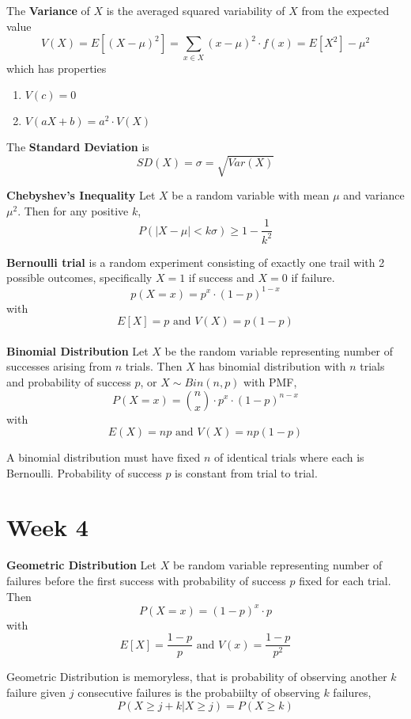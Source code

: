 \documentclass[11pt]{article}
\begin{document}
\begin{defn}
  The \textbf{Variance} of $X$ is the averaged squared variability of $X$ from the expected value
  \[
    V(X) = E[(X-\mu)^2] = \sum_{x\in X} (x-\mu)^2 \cdot f(x) = E[X^2] - \mu^2
  \]
  which has properties
  \begin{enumerate}
    \item $V(c) = 0$
    \item $V(aX + b) = a^2 \cdot V(X)$
  \end{enumerate}
  The \textbf{Standard Deviation} is
  \[
    SD(X) = \sigma = \sqrt{Var(X)}
  \]
\end{defn}


\begin{theorem}
  \textbf{Chebyshev's Inequality} Let $X$ be a random variable with mean $\mu$ and variance $\mu^2$. Then for any positive $k$,
  \[
    P(|X-\mu| < k\sigma) \geq 1 - \frac{1}{k^2}
  \]
\end{theorem}


\textbf{Bernoulli trial} is a random experiment consisting of exactly one trail with 2 possible outcomes, specifically $X=1$ if success and $X=0$ if failure.
\[
  p(X=x) = p^x \cdot (1-p)^{1-x}
\]
with
\[
  E[X] = p \text{ and } V(X) = p(1-p)
\]
\\

\textbf{Binomial Distribution} Let $X$ be the random variable representing number of successes arising from $n$ trials. Then $X$ has binomial distribution with $n$ trials and probability of success $p$, or $X\sim Bin(n,p)$ with PMF,
\[
  P(X=x) = \binom{n}{x} \cdot p^x \cdot (1-p)^{n-x}
\]
with
\[
  E(X) = np \text{ and } V(X) = np(1-p)
\]
\begin{rem}
  A binomial distribution must have fixed $n$ of identical trials where each is Bernoulli. Probability of success $p$ is constant from trial to trial.
\end{rem}



\section*{Week 4}

\textbf{Geometric Distribution}
Let $X$ be random variable representing number of failures before the first success with probability of success $p$ fixed for each trial. Then
\[
  P(X=x) = (1-p)^x \cdot p
\]
with
\[
  E[X] = \frac{1-p}{p} \text{ and } V(x) = \frac{1-p}{p^2}
\]
\begin{rem}
  Geometric Distribution is memoryless, that is probability of observing another $k$ failure given $j$ consecutive failures is the probabiilty of observing $k$ failures,
  \[
    P(X\geq j+k | X\geq j) = P(X\geq k)
  \]
\end{rem}
\end{document}
